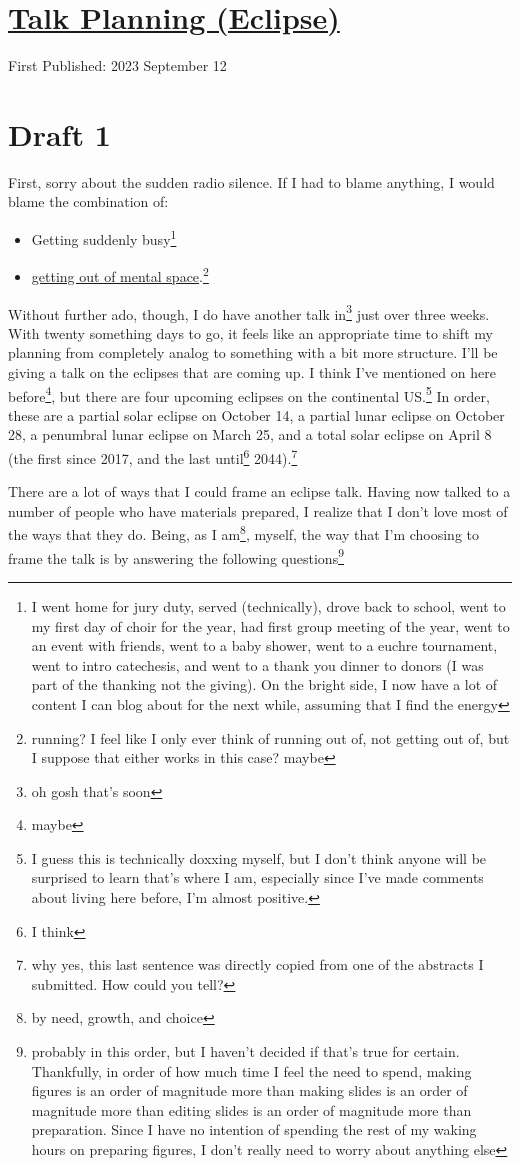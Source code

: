 \documentclass[12pt]{article}[titlepage]
\newcommand{\1}{\={a}}
\newcommand{\2}{\={e}}
\newcommand{\3}{\={\i}}
\newcommand{\4}{\=o}
\newcommand{\5}{\=u}
\newcommand{\6}{\={A}}
\renewcommand{\,}{\textsuperscript{,}}
\begin{document}
\doublespacing
\section{\href{talk-planning-eclipse-1.html}{Talk Planning (Eclipse)}}
First Published: 2023 September 12
\section{Draft 1}
First, sorry about the sudden radio silence.
If I had to blame anything, I would blame the combination of:
\begin{itemize}
\item Getting suddenly busy\footnote{I went home for jury duty, served (technically), drove back to school, went to my first day of choir for the year, had first group meeting of the year, went to an event with friends, went to a baby shower, went to a euchre tournament, went to intro catechesis, and went to a thank you dinner to donors (I was part of the thanking not the giving). On the bright side, I now have a lot of content I can blog about for the next while, assuming that I find the energy}
\item \href{spoons-2}{getting out of mental space}.\footnote{running? I feel like I only ever think of running out of, not getting out of, but I suppose that either works in this case? maybe}
\end{itemize}

Without further ado, though, I do have another talk in\footnote{oh gosh that's soon} just over three weeks.
With twenty something days to go, it feels like an appropriate time to shift my planning from completely analog to something with a bit more structure.
I'll be giving a talk on the eclipses that are coming up.
I think I've mentioned on here before\footnote{maybe}, but there are four upcoming eclipses on the continental US.\footnote{I guess this is technically doxxing myself, but I don't think anyone will be surprised to learn that's where I am, especially since I've made comments about living here before, I'm almost positive.}
In order, these are a partial solar eclipse on October 14, a partial lunar eclipse on October 28, a penumbral lunar eclipse on March 25, and a total solar eclipse on April 8 (the first since 2017, and the last until\footnote{I think} 2044).\footnote{why yes, this last sentence was directly copied from one of the abstracts I submitted.
How could you tell?}

There are a lot of ways that I could frame an eclipse talk.
Having now talked to a number of people who have materials prepared, I realize that I don't love most of the ways that they do.
Being, as I am\footnote{by need, growth, and choice}, myself, the way that I'm choosing to frame the talk is by answering the following questions\footnote{probably in this order, but I haven't decided if that's true for certain.
Thankfully, in order of how much time I feel the need to spend, making figures is an order of magnitude more than making slides is an order of magnitude more than editing slides is an order of magnitude more than preparation.
Since I have no intention of spending the rest of my waking hours on preparing figures, I don't really need to worry about anything else}
\end{document}
